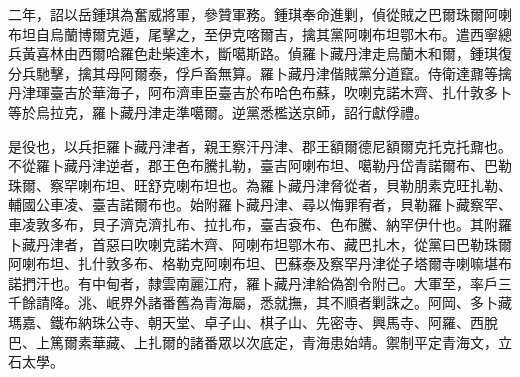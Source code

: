 \begin{pinyinscope}
二年，詔以岳鍾琪為奮威將軍，參贊軍務。鍾琪奉命進剿，偵從賊之巴爾珠爾阿喇布坦自烏蘭博爾克遁，尾擊之，至伊克喀爾吉，擒其黨阿喇布坦鄂木布。遣西寧總兵黃喜林由西爾哈羅色赴柴達木，斷噶斯路。偵羅卜藏丹津走烏蘭木和爾，鍾琪復分兵馳擊，擒其母阿爾泰，俘戶畜無算。羅卜藏丹津偕賊黨分道竄。侍衛達鼐等擒丹津琿臺吉於華海子，阿布濟車臣臺吉於布哈色布蘇，吹喇克諾木齊、扎什敦多卜等於烏拉克，羅卜藏丹津走準噶爾。逆黨悉檻送京師，詔行獻俘禮。

是役也，以兵拒羅卜藏丹津者，親王察汗丹津、郡王額爾德尼額爾克托克托鼐也。不從羅卜藏丹津逆者，郡王色布騰扎勒，臺吉阿喇布坦、噶勒丹岱青諾爾布、巴勒珠爾、察罕喇布坦、旺舒克喇布坦也。為羅卜藏丹津脅從者，貝勒朋素克旺扎勒、輔國公車凌、臺吉諾爾布也。始附羅卜藏丹津、尋以悔罪宥者，貝勒羅卜藏察罕、車凌敦多布，貝子濟克濟扎布、拉扎布，臺吉袞布、色布騰、納罕伊什也。其附羅卜藏丹津者，首惡曰吹喇克諾木齊、阿喇布坦鄂木布、藏巴扎木，從黨曰巴勒珠爾阿喇布坦、扎什敦多布、格勒克阿喇布坦、巴蘇泰及察罕丹津從子塔爾寺喇嘛堪布諾捫汗也。有中甸者，隸雲南麗江府，羅卜藏丹津給偽劄令附己。大軍至，率戶三千餘請降。洮、岷界外諸番舊為青海屬，悉就撫，其不順者剿誅之。阿岡、多卜藏瑪嘉、鐵布納珠公寺、朝天堂、卓子山、棋子山、先密寺、興馬寺、阿羅、西脫巴、上篤爾素華藏、上扎爾的諸番眾以次底定，青海患始靖。禦制平定青海文，立石太學。


\end{pinyinscope}
